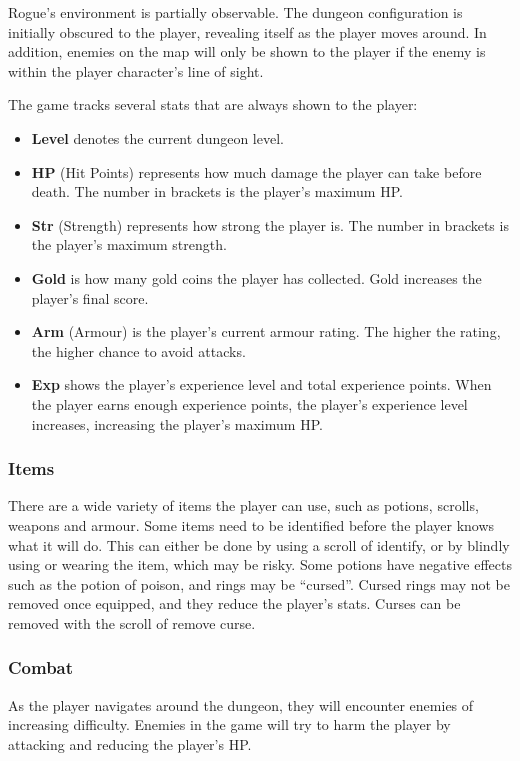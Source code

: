 \documentclass[12pt,a4paper]{article}
\begin{document}
    Rogue's environment is partially observable.
    The dungeon configuration is initially obscured to the player, revealing itself as the player moves around.
    In addition, enemies on the map will only be shown to the player if the enemy is within the player character's line of sight.

    The game tracks several stats that are always shown to the player:
    \begin{itemize}
        \item \textbf{Level} denotes the current dungeon level.
        \item \textbf{HP} (Hit Points) represents how much damage the player can take before death.
            The number in brackets is the player's maximum HP.
        \item \textbf{Str} (Strength) represents how strong the player is.
            The number in brackets is the player's maximum strength.
        \item \textbf{Gold} is how many gold coins the player has collected.
            Gold increases the player's final score.
        \item \textbf{Arm} (Armour) is the player's current armour rating.
            The higher the rating, the higher chance to avoid attacks.
        \item \textbf{Exp} shows the player's experience level and total experience points.
            When the player earns enough experience points, the player's experience level increases, increasing the player's maximum HP.
    \end{itemize}

    \subsubsection{Items}\label{subsubsec:items}

    There are a wide variety of items the player can use, such as potions, scrolls, weapons and armour.
    Some items need to be identified before the player knows what it will do.
    This can either be done by using a scroll of identify, or by blindly using or wearing the item, which may be risky.
    Some potions have negative effects such as the potion of poison, and rings may be ``cursed''.
    Cursed rings may not be removed once equipped, and they reduce the player's stats.
    Curses can be removed with the scroll of remove curse.

    \subsubsection{Combat}\label{subsubsec:combat}
    As the player navigates around the dungeon, they will encounter enemies of increasing difficulty.
    Enemies in the game will try to harm the player by attacking and reducing the player's HP\@.
\end{document}
